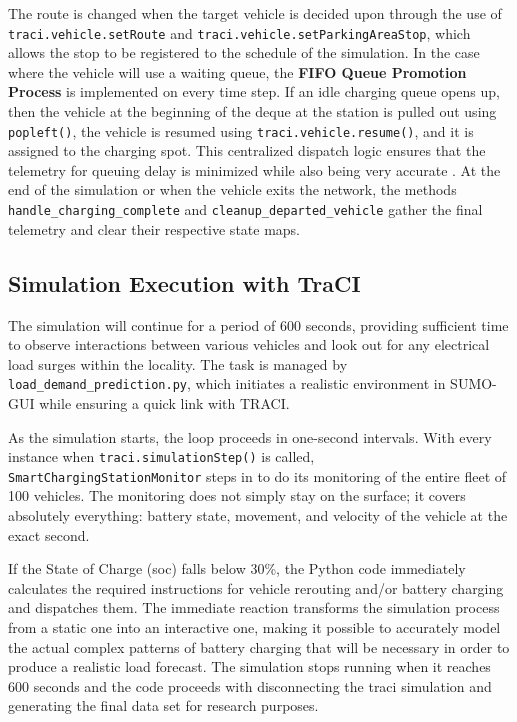 \documentclass{thesis-library}
\begin{document}
The route is changed when the target vehicle is decided upon through the use of \texttt{traci.\allowbreak vehicle.\allowbreak setRoute} and \texttt{traci.\allowbreak vehicle.\allowbreak setParkingAreaStop}, which allows the stop to be registered to the schedule of the simulation. In the case where the vehicle will use a waiting queue, the \textbf{FIFO Queue Promotion Process} is implemented on every time step. If an idle charging queue opens up, then the vehicle at the beginning of the deque at the station is pulled out using \texttt{popleft()}, the vehicle is resumed using \texttt{traci.vehicle.resume()}, and it is assigned to the charging spot. This centralized dispatch logic ensures that the telemetry for queuing delay is minimized while also being very accurate \cite{queue_management2023}. At the end of the simulation or when the vehicle exits the network, the methods \texttt{handle\_charging\_complete} and \texttt{cleanup\_departed\_vehicle} gather the final telemetry and clear their respective state maps.

\subsection{Simulation Execution with TraCI}

The simulation will continue for a period of 600 seconds, providing sufficient time to observe interactions between various vehicles and look out for any electrical load surges within the locality. The task is managed by \texttt{load\_\allowbreak demand\_\allowbreak prediction.py}, which initiates a realistic environment in SUMO-GUI while ensuring a quick link with TRACI.

As the simulation starts, the loop proceeds in one-second intervals. With every instance when \texttt{traci.\allowbreak simulation\-Step()} is called, \texttt{Smart\-Charging\-Station\-Monitor} steps in to do its monitoring of the entire fleet of 100 vehicles. The monitoring does not simply stay on the surface; it covers absolutely everything: battery state, movement, and velocity of the vehicle at the exact second.

If the State of Charge (\Gls{soc}) falls below 30\%, the Python code immediately calculates the required instructions for vehicle rerouting and/or battery charging and dispatches them. The immediate reaction transforms the simulation process from a static one into an interactive one, making it possible to accurately model the actual complex patterns of battery charging that will be necessary in order to produce a realistic load forecast. The simulation stops running when it reaches 600 seconds and the code proceeds with disconnecting the \Gls{traci} simulation and generating the final data set for research purposes.
\end{document}
